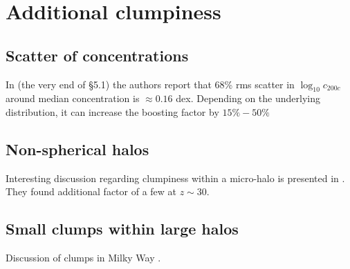 
\section{Additional clumpiness}
\subsection{Scatter of concentrations}
In \cite{2014arXiv1407.4730D} (the very end of \S5.1) the authors report that 68\% rms scatter in $\log_{10}c_{200c}$ around median concentration is $\approx 0.16$ dex. Depending on the underlying distribution, it can increase the boosting factor by $15\%-50\%$

\subsection{Non-spherical halos}
Interesting discussion regarding clumpiness within a micro-halo is presented in \citet{Anderhalden_2013}. They found additional factor of a few at $z \sim 30$.

\subsection{Small clumps within large halos}
Discussion of clumps in Milky Way \cite{Belotsky_2014}.